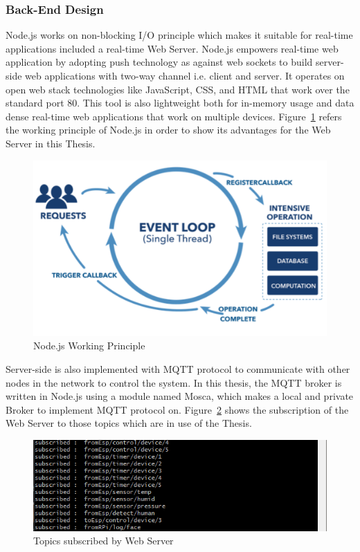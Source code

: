         \subsubsection{Back-End Design}
        Node.js works on non-blocking I/O principle which makes it suitable for real-time applications included a real-time Web Server. Node.js empowers real-time web application by adopting push technology as against web sockets to build server-side web applications with two-way channel i.e. client and server. It operates on open web stack technologies like JavaScript, CSS, and HTML that work over the standard port 80. This tool is also lightweight both for in-memory usage and data dense real-time web applications that work on multiple devices. Figure~\ref{fig:nonBlocking} refers the working principle of Node.js in order to show its advantages for the Web Server in this Thesis.
        \begin{figure}[!htb]
            \begin{center}
            \includegraphics[scale=0.65]{images/nonBlocking.png}
            \caption{Node.js Working Principle}
            \label{fig:nonBlocking}
            \end{center}
        \end{figure}

        Server-side is also implemented with MQTT protocol to communicate with other nodes in the network to control the system. In this thesis, the MQTT broker is written in Node.js using a module named Mosca, which makes a local and private Broker to implement MQTT protocol on. Figure~\ref{fig:webSub} shows the subscription of the Web Server to those topics which are in use of the Thesis.
        \begin{figure}[!htb]
            \begin{center}
            \includegraphics[scale=0.9]{images/webSub.png}
            \caption{Topics subscribed by Web Server}
            \label{fig:webSub}
            \end{center}
        \end{figure}

